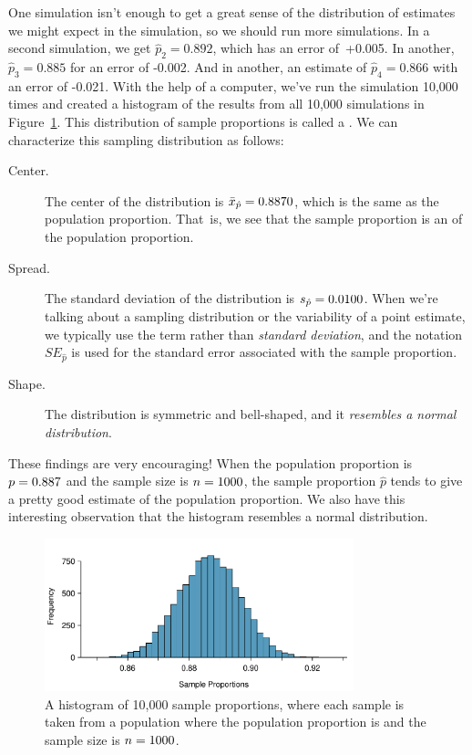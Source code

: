 One simulation isn't enough to get a great sense of the
distribution of estimates we might expect in the simulation,
so we should run more simulations.
In a second simulation,
we get $\hat{p}_2 = 0.892$, which has an error of~+0.005.
In another, $\hat{p}_3 = 0.885$ for an error of -0.002. And in another,
an estimate of $\hat{p}_4 = 0.866$ with an error of -0.021.
With the help of a computer, we've run the simulation 10,000 times
and created a histogram of the results from all 10,000 simulations
in Figure~\ref{sampling_10k_prop_887p}. This
distribution of sample proportions is called a
.
We can characterize this sampling distribution as follows:
\begin{description}
\item[Center.] The center of the distribution is
    $\bar{x}_{\hat{p}} = 0.887{}0$, which is the same as the
    population proportion.
    That~is, we see that the sample proportion is an
    of the population proportion.
\item[Spread.] The standard deviation of the distribution
    is $s_{\hat{p}} = 0.0100{}$. When we're talking about
    a sampling distribution or the variability of
    a point estimate, we typically use the term
    rather than \emph{standard deviation},
    and the notation $SE_{\hat{p}}$ is used for the standard
    error associated with the sample proportion.
\item[Shape.] The distribution is symmetric and bell-shaped,
    and it \emph{resembles a normal distribution}.
\end{description}
These findings are very encouraging! When the population
proportion is $p = 0.887{}$ and the sample size is
$n = 1000{}$,
the sample proportion $\hat{p}$ tends to give a pretty good estimate
of the population proportion. We also have this interesting observation
that the histogram resembles a normal distribution.

\begin{figure}
   \centering
   \includegraphics[width=0.8\textwidth]{ch_foundations_for_inf/figures/sampling_10k_prop_887p/sampling_10k_prop_887p}
   \caption{A histogram of 10,000 sample proportions, where each
       sample is taken from a population where the population
       proportion is \pewsolarpollprop{} and the sample size is
       $n = 1000{}$.}
   \label{sampling_10k_prop_887p}
\end{figure}

